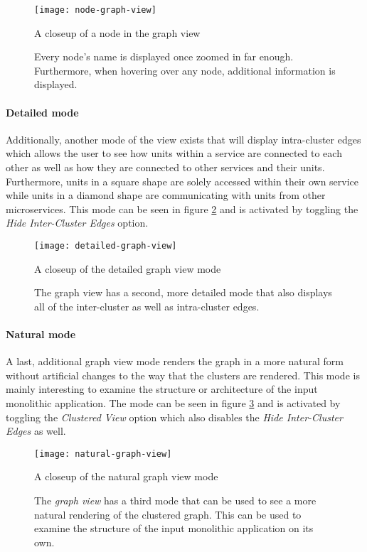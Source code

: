\documentclass[12pt,a4paper]{report}
\begin{document}
\begin{figure}[htbp]
\centering
\texttt{[image: node-graph-view]}
\caption{A closeup of a node in the graph view}
\caption*{\centering
  Every node's name is displayed once zoomed in far enough.
  Furthermore, when hovering over any node, additional information is displayed.
}
\label{fig:node-graph-view}
\end{figure}

\paragraph{Detailed mode}
Additionally, another mode of the view exists that will display intra-cluster
edges which allows the user to see how units within a service are connected
to each other as well as how they are connected to other services and their
units. Furthermore, units in a square shape are solely accessed within their
own service while units in a diamond shape are communicating with units from
other microservices.
This mode can be seen in figure \ref{fig:detailed-graph-view} and is
activated by toggling the \textit{Hide Inter-Cluster Edges} option.

\begin{figure}[htbp]
\centering
\texttt{[image: detailed-graph-view]}
\caption{A closeup of the detailed graph view mode}
\caption*{\centering
  The graph view has a second, more detailed mode that also displays
  all of the inter-cluster as well as intra-cluster edges.
}
\label{fig:detailed-graph-view}
\end{figure}

\paragraph{Natural mode}
A last, additional graph view mode renders the graph in a more natural form
without artificial changes to the way that the clusters are rendered.
This mode is mainly interesting to examine the structure or architecture
of the input monolithic application.
The mode can be seen in figure \ref{fig:natural-graph-view} and is
activated by toggling the \textit{Clustered View} option which also disables
the \textit{Hide Inter-Cluster Edges} as well.

\begin{figure}[htbp]
\centering
\texttt{[image: natural-graph-view]}
\caption{A closeup of the natural graph view mode}
\caption*{\centering
  The \textit{graph view} has a third mode that can be used to see a more
  natural rendering of the clustered graph. This can be used to examine
  the structure of the input monolithic application on its own.
}
\label{fig:natural-graph-view}
\end{figure}
\end{document}
